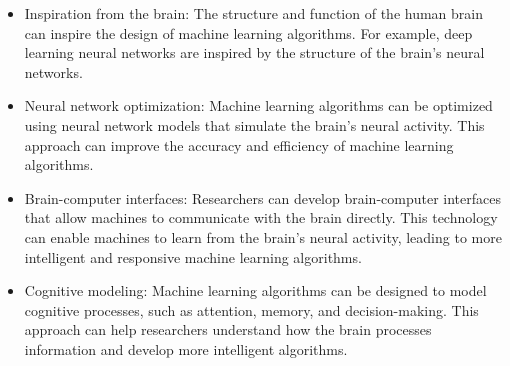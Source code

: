 \documentclass[letterpaper,11pt]{article}
\begin{document}
\begin{itemize}
    \item Inspiration from the brain: The structure and function of the human brain can inspire the design of machine learning algorithms. For example, deep learning neural networks are inspired by the structure of the brain's neural networks.

    \item Neural network optimization: Machine learning algorithms can be optimized using neural network models that simulate the brain's neural activity. This approach can improve the accuracy and efficiency of machine learning algorithms.

    \item Brain-computer interfaces: Researchers can develop brain-computer interfaces that allow machines to communicate with the brain directly. This technology can enable machines to learn from the brain's neural activity, leading to more intelligent and responsive machine learning algorithms.

    \item Cognitive modeling: Machine learning algorithms can be designed to model cognitive processes, such as attention, memory, and decision-making. This approach can help researchers understand how the brain processes information and develop more intelligent algorithms.

\end{itemize}
\end{document}
